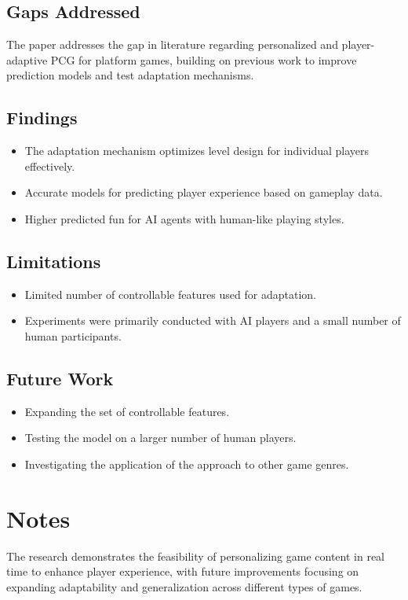 \subsection{Gaps Addressed}
The paper addresses the gap in literature regarding personalized and player-adaptive PCG for platform games, building on previous work to improve prediction models and test adaptation mechanisms.

\subsection{Findings}
\begin{itemize}
    \item The adaptation mechanism optimizes level design for individual players effectively.
    \item Accurate models for predicting player experience based on gameplay data.
    \item Higher predicted fun for AI agents with human-like playing styles.
\end{itemize}

\subsection{Limitations}
\begin{itemize}
    \item Limited number of controllable features used for adaptation.
    \item Experiments were primarily conducted with AI players and a small number of human participants.
\end{itemize}

\subsection{Future Work}
\begin{itemize}
    \item Expanding the set of controllable features.
    \item Testing the model on a larger number of human players.
    \item Investigating the application of the approach to other game genres.
\end{itemize}

\section{Notes}
The research demonstrates the feasibility of personalizing game content in real time to enhance player experience, with future improvements focusing on expanding adaptability and generalization across different types of games.
